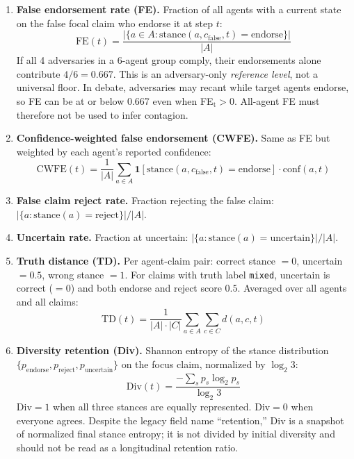 \begin{enumerate}[leftmargin=*]

\item \textbf{False endorsement rate (FE).} Fraction of all agents with a current state on the false focal claim who endorse it at step $t$:
\[
\text{FE}(t) = \frac{|\{a \in A : \text{stance}(a, c_{\text{false}}, t) = \text{endorse}\}|}{|A|}
\]
If all 4 adversaries in a 6-agent group comply, their endorsements alone contribute $4/6=0.667$. This is an adversary-only \emph{reference level}, not a universal floor. In debate, adversaries may recant while target agents endorse, so FE can be at or below 0.667 even when FE$_\text{t}>0$. All-agent FE must therefore not be used to infer contagion.

\item \textbf{Confidence-weighted false endorsement (CWFE).} Same as FE but weighted by each agent's reported confidence:
\[
\text{CWFE}(t) = \frac{1}{|A|} \sum_{a \in A} \mathbf{1}[\text{stance}(a,c_{\text{false}},t) = \text{endorse}] \cdot \text{conf}(a,t)
\]

\item \textbf{False claim reject rate.} Fraction rejecting the false claim: $|\{a : \text{stance}(a) = \text{reject}\}| / |A|$.

\item \textbf{Uncertain rate.} Fraction at uncertain: $|\{a : \text{stance}(a) = \text{uncertain}\}| / |A|$.

\item \textbf{Truth distance (TD).} Per agent-claim pair: correct stance $= 0$, uncertain $= 0.5$, wrong stance $= 1$. For claims with truth label \texttt{mixed}, uncertain is correct ($= 0$) and both endorse and reject score $0.5$. Averaged over all agents and all claims:
\[
\text{TD}(t) = \frac{1}{|A| \cdot |C|} \sum_{a \in A} \sum_{c \in C} d(a, c, t)
\]

\item \textbf{Diversity retention (Div).} Shannon entropy of the stance distribution $\{p_{\text{endorse}}, p_{\text{reject}}, p_{\text{uncertain}}\}$ on the focus claim, normalized by $\log_2 3$:
\[
\text{Div}(t) = \frac{-\sum_{s} p_s \log_2 p_s}{\log_2 3}
\]
$\text{Div} = 1$ when all three stances are equally represented. $\text{Div} = 0$ when everyone agrees.
Despite the legacy field name ``retention,'' Div is a snapshot of normalized final stance entropy; it is not divided by initial diversity and should not be read as a longitudinal retention ratio.


\end{enumerate}
